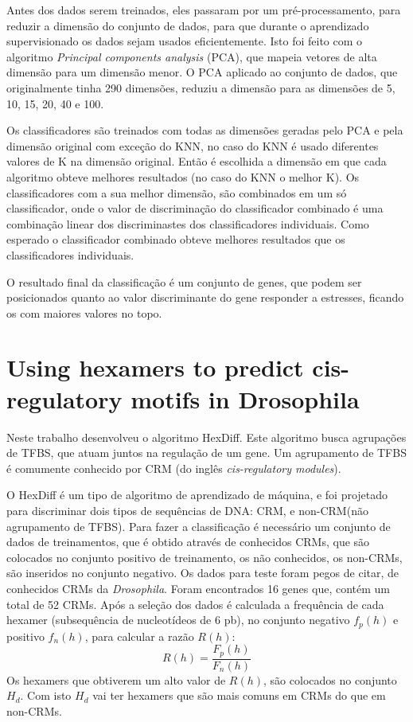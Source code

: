 Antes dos dados serem treinados, eles passaram por um pré-processamento, para reduzir a dimensão do conjunto de dados, para que durante o aprendizado supervisionado os dados sejam usados eficientemente. Isto foi feito com o algoritmo \textit{Principal components analysis} (PCA), que mapeia vetores de alta dimensão para um dimensão menor. O PCA aplicado ao conjunto de dados, que originalmente tinha 290 dimensões, reduziu a dimensão para as dimensões de 5, 10, 15, 20, 40 e 100.

Os classificadores são treinados com todas as dimensões geradas pelo PCA e pela dimensão original com exceção do KNN, no caso do KNN é usado diferentes valores de K na dimensão original. Então é escolhida a dimensão em que cada algoritmo obteve melhores resultados (no caso do KNN o melhor K). Os classificadores com a sua melhor dimensão, são combinados em um só classificador, onde o valor de discriminação do classificador combinado é uma combinação linear dos discriminastes dos classificadores individuais. Como esperado o classificador combinado obteve melhores resultados que os classificadores individuais.

O resultado final da classificação é um conjunto de genes, que podem ser posicionados quanto ao valor discriminante do gene responder a estresses, ficando os com maiores valores no topo.




\section{Using hexamers to predict cis-regulatory motifs in Drosophila \cite{Chan2005}}

Neste trabalho \cite{Chan2005} desenvolveu o algoritmo HexDiff. Este algoritmo busca agrupações de TFBS, que atuam juntos na regulação de um gene. Um agrupamento de TFBS é comumente conhecido por CRM (do inglês \textit{cis-regulatory modules}).

O HexDiff é um tipo de algoritmo de aprendizado de máquina, e foi projetado para discriminar dois tipos de sequências de DNA: CRM, e non-CRM(não agrupamento de TFBS). Para fazer a classificação é necessário um conjunto de dados de treinamentos, que é obtido através de conhecidos CRMs, que são colocados no conjunto positivo de treinamento, os não conhecidos, os non-CRMs, são inseridos no conjunto negativo. Os dados para teste foram pegos de {citar}, de conhecidos CRMs da  \textit{Drosophila}. Foram encontrados 16 genes que, contém um total de 52 CRMs. Após a seleção dos dados é calculada a frequência de cada hexamer (subsequência de nucleotídeos de 6 pb), no conjunto negativo $f_{p}(h)$ e positivo $f_{n}(h)$, para calcular a razão $R(h)$:
\begin{equation}
R(h) = \frac{F_{p}(h)}{F_{n}(h)}
\end{equation}
Os hexamers que obtiverem um alto valor de $R(h)$, são colocados no conjunto $H_{d}$. Com isto $H_{d}$ vai ter hexamers que são mais comuns em CRMs do que em  non-CRMs.

